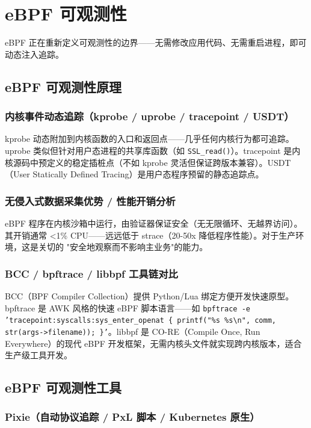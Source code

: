 \documentclass[12pt,UTF8]{ctexbook}
\begin{document}
\chapter{eBPF 可观测性}
\label{chap:ebpf-observability}

eBPF 正在重新定义可观测性的边界——无需修改应用代码、无需重启进程，即可动态注入追踪。

  \section{eBPF 可观测性原理}
    \subsection{内核事件动态追踪（kprobe / uprobe / tracepoint / USDT）}

kprobe 动态附加到内核函数的入口和返回点——几乎任何内核行为都可追踪。uprobe 类似但针对用户态进程的共享库函数（如 \texttt{SSL\_read()}）。tracepoint 是内核源码中预定义的稳定插桩点（不如 kprobe 灵活但保证跨版本兼容）。USDT（User Statically Defined Tracing）是用户态程序预留的静态追踪点。

    \subsection{无侵入式数据采集优势 / 性能开销分析}

eBPF 程序在内核沙箱中运行，由验证器保证安全（无无限循环、无越界访问）。其开销通常 <1\% CPU——远远低于 strace（20-50x 降低程序性能）。对于生产环境，这是关切的 "安全地观察而不影响主业务"的能力。

    \subsection{BCC / bpftrace / libbpf 工具链对比}

BCC（BPF Compiler Collection）提供 Python/Lua 绑定方便开发快速原型。bpftrace 是 AWK 风格的快速 eBPF 脚本语言——如 \texttt{bpftrace -e 'tracepoint:syscalls:sys\_enter\_openat \{ printf("\%s \%s\textbackslash n", comm, str(args->filename)); \}'}。libbpf 是 CO-RE（Compile Once, Run Everywhere）的现代 eBPF 开发框架，无需内核头文件就实现跨内核版本，适合生产级工具开发。

  \section{eBPF 可观测性工具}
    \subsection{Pixie（自动协议追踪 / PxL 脚本 / Kubernetes 原生）}
\end{document}
